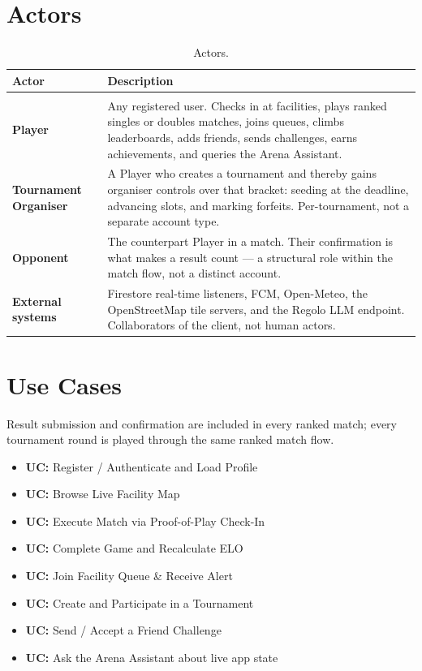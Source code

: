 \documentclass{configurations/polimi3i_thesis}
\renewcommand{\_}{\textunderscore\allowbreak}
\begin{document}
\section{Actors}
\label{sec:actors}

\begin{table}[H]
    \centering
    \small
    \begin{tabularx}{\textwidth}{l X}
        \textbf{Actor} & \textbf{Description} \\\hline\\[-9px]
        \textbf{Player} & Any registered user. Checks in at facilities, plays ranked singles or doubles matches, joins queues, climbs leaderboards, adds friends, sends challenges, earns achievements, and queries the Arena Assistant. \\[3px]
        \textbf{Tournament Organiser} & A Player who creates a tournament and thereby gains organiser controls over that bracket: seeding at the deadline, advancing slots, and marking forfeits. Per-tournament, not a separate account type. \\[3px]
        \textbf{Opponent} & The counterpart Player in a match. Their confirmation is what makes a result count — a structural role within the match flow, not a distinct account. \\[3px]
        \textbf{External systems} & Firestore real-time listeners, FCM, Open-Meteo, the OpenStreetMap tile servers, and the Regolo LLM endpoint. Collaborators of the client, not human actors. \\[3px]
    \end{tabularx}
    \caption{Actors.}
    \label{tab:actors}
\end{table}

\section{Use Cases}
\label{sec:use_case_diagrams}

Result submission and confirmation are included in every ranked match; every tournament round is played through the same ranked match flow.

\begin{itemize}
    \item \textbf{UC\_1:} Register / Authenticate and Load Profile
    \item \textbf{UC\_2:} Browse Live Facility Map
    \item \textbf{UC\_3:} Execute Match via Proof-of-Play Check-In
    \item \textbf{UC\_4:} Complete Game and Recalculate ELO
    \item \textbf{UC\_5:} Join Facility Queue \& Receive Alert
    \item \textbf{UC\_6:} Create and Participate in a Tournament
    \item \textbf{UC\_7:} Send / Accept a Friend Challenge
    \item \textbf{UC\_8:} Ask the Arena Assistant about live app state
\end{itemize}
\end{document}

